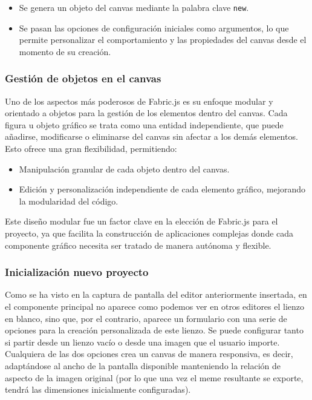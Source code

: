 \begin{itemize}
    \item Se genera un objeto del canvas mediante la palabra clave \texttt{new}.
    \item Se pasan las opciones de configuración iniciales como argumentos, lo que permite personalizar el comportamiento y las propiedades del canvas desde el momento de su creación.
\end{itemize}

\subsubsection{Gestión de objetos en el canvas}

Uno de los aspectos más poderosos de Fabric.js es su enfoque modular y orientado a objetos para la gestión de los elementos dentro del canvas. Cada figura u objeto gráfico se trata como una entidad independiente, que puede añadirse, modificarse o eliminarse del canvas sin afectar a los demás elementos. Esto ofrece una gran flexibilidad, permitiendo:

\begin{itemize}
    \item Manipulación granular de cada objeto dentro del canvas.
    \item Edición y personalización independiente de cada elemento gráfico, mejorando la modularidad del código.
\end{itemize}

Este diseño modular fue un factor clave en la elección de Fabric.js para el proyecto, ya que facilita la construcción de aplicaciones complejas donde cada componente gráfico necesita ser tratado de manera autónoma y flexible.

\subsubsection{Inicialización nuevo proyecto}

Como se ha visto en la captura de pantalla del editor anteriormente insertada, en el componente principal no aparece como podemos ver en otros editores el lienzo en blanco, sino que, por el contrario, aparece un formulario con una serie de opciones para la creación personalizada de este lienzo. Se puede configurar tanto si partir desde un lienzo vacío o desde una imagen que el usuario importe. Cualquiera de las dos opciones crea un canvas de manera responsiva, es decir, adaptándose al ancho de la pantalla disponible manteniendo la relación de aspecto de la imagen original (por lo que una vez el meme resultante se exporte, tendrá las dimensiones inicialmente configuradas).


